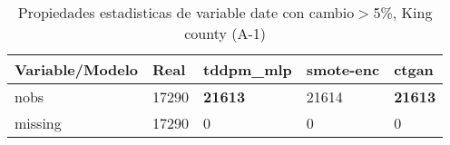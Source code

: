 \begin{table}[H]
\centering
\fontsize{8}{14}\selectfont
\caption{Propiedades estadisticas de variable date con cambio\ensuremath{>}5\%, King county (A-1)}
\label{table-stats-king county-a-1-date-short}
\begin{tabular}{|l|m{10em}|m{10em}|m{10em}|m{10em}|}
\hline
 \rowcolor[gray]{0.8}
Variable/Modelo & Real & tddpm\_mlp & smote-enc & ctgan \\
\hline nobs & 17290 & \bfseries 21613 & \cellcolor[rgb]{0.9, 0.54, 0.52} 21614 & \bfseries 21613 \\
\hline missing & 17290 & 0 & 0 & 0 \\
\hline
\end{tabular}
\end{table}
